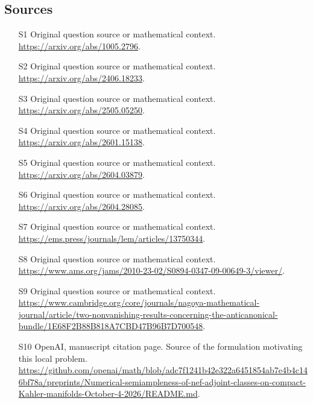 \documentclass[11pt]{article}
\begin{document}
\subsection{Sources}
\begin{itemize}
\item[S1] Original question source or mathematical context.
\url{https://arxiv.org/abs/1005.2796}.
\item[S2] Original question source or mathematical context.
\url{https://arxiv.org/abs/2406.18233}.
\item[S3] Original question source or mathematical context.
\url{https://arxiv.org/abs/2505.05250}.
\item[S4] Original question source or mathematical context.
\url{https://arxiv.org/abs/2601.15138}.
\item[S5] Original question source or mathematical context.
\url{https://arxiv.org/abs/2604.03879}.
\item[S6] Original question source or mathematical context.
\url{https://arxiv.org/abs/2604.28085}.
\item[S7] Original question source or mathematical context.
\url{https://ems.press/journals/lem/articles/13750344}.
\item[S8] Original question source or mathematical context.
\url{https://www.ams.org/jams/2010-23-02/S0894-0347-09-00649-3/viewer/}.
\item[S9] Original question source or mathematical context.
\url{https://www.cambridge.org/core/journals/nagoya-mathematical-journal/article/two-nonvanishing-results-concerning-the-anticanonical-bundle/1E68F2B88B818A7CBD47B96B7D700548}.
\item[S10] OpenAI, manuscript citation page. Source of the formulation motivating this local problem.
\url{https://github.com/openai/math/blob/adc7f1241b42e322a6451854ab7e4b4c146bf78a/preprints/Numerical-semiampleness-of-nef-adjoint-classes-on-compact-Kahler-manifolds-October-4-2026/README.md}.
\end{itemize}
\end{document}
